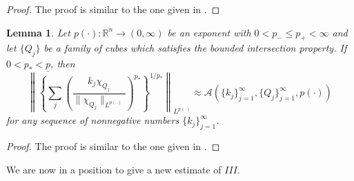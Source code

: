 \documentclass[oneside,10pt]{article}
\newtheorem{lemma}[theorem]{Lemma}
\begin{document}
\begin{proof}
The proof is similar to the one given in \cite[Proposition 3.3]{Rocha2}.
\end{proof}

\begin{lemma} \label{ineq p star}
Let $p(\cdot) : \mathbb{R}^{n} \to (0, \infty)$ be an exponent with $0 < p_{-} \leq p_{+} < \infty$ and let $\{ Q_j \}$ be a family of cubes which satisfies the bounded intersection property. If $0 < p_{*} < \underline{p}$, then
\[
\left\| \left\{ \sum_j \left( \frac{k_j \chi_{Q_j}}{\| \chi_{Q_j} \|_{L^{p(\cdot)}}} \right)^{p_{*}} \right\}^{1/p_{*}}
\right\|_{L^{p(\cdot)}} \approx \mathcal{A} \left( \{ k_j \}_{j=1}^{\infty}, \{ Q_j \}_{j=1}^{\infty}, p(\cdot) \right)
\]
for any sequence of nonnegative numbers $\{ k_j \}_{j=1}^{\infty}$.
\end{lemma}

\begin{proof}
The proof is similar to the one given in \cite[Lemma 5.7]{Rocha2}.
\end{proof}

We are now in a position to give a new estimate of $III$.

\
\end{document}
